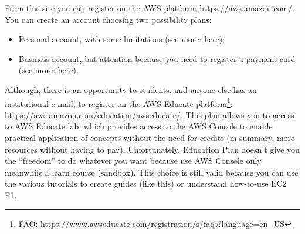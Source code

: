 \documentclass[a4paper]{article}
\newcommand{\dquotes}[1]{``#1''}
\begin{document}
    From this site you can register on the AWS platform: \url{https://aws.amazon.com/}. You can create an account choosing two possibility plans:
    \begin{itemize}
        \item Personal account, with some limitations (see more: \href{https://aws.amazon.com/free/?all-free-tier.sort-by=item.additionalFields.SortRank&all-free-tier.sort-order=asc&awsf.Free%20Tier%20Types=*all&awsf.Free%20Tier%20Categories=*all}{here});

        \item Business account, but attention because you need to register a payment card (see more: \href{https://aws.amazon.com/premiumsupport/plans/}{here}).
    \end{itemize}
    Although, there is an opportunity to students, and anyone else has an institutional e-mail, to register on the AWS Educate platform\footnote{FAQ: \url{https://www.awseducate.com/registration/s/faqs?language=en_US}}: \url{https://aws.amazon.com/education/awseducate/}. This plan allows you to access to AWS Educate lab, which provides access to the AWS Console to enable practical application of concepts without the need for credits (in summary, more resources without having to pay).\newline
    Unfortunately, Education Plan doesn’t give you the \dquotes{freedom} to do whatever you want because use AWS Console only meanwhile a learn course (sandbox).
    This choice is still valid because you can use the various tutorials to create guides (like this) or understand how-to-use EC2 F1.
\end{document}
